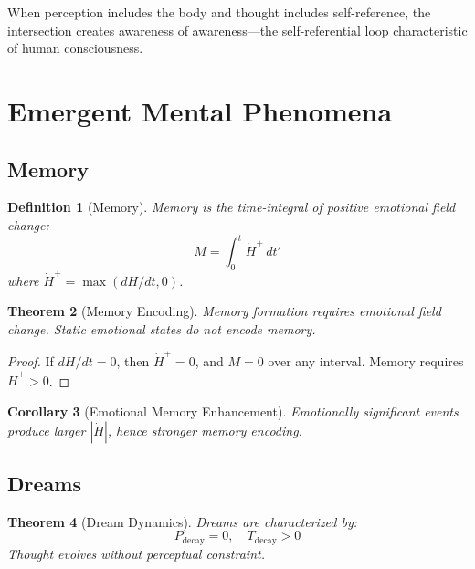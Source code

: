 \documentclass[twocolumn,amsmath,amssymb,aps,prl,superscriptaddress]{revtex4-2}
\newtheorem{theorem}{Theorem}[section]
\newtheorem{corollary}[theorem]{Corollary}
\newtheorem{definition}[theorem]{Definition}
\newcommand{\Pdecay}{P_{\text{decay}}}
\newcommand{\Tdecay}{T_{\text{decay}}}
\newcommand{\Hfield}{H}
\begin{document}
When perception includes the body and thought includes self-reference, the intersection creates awareness of awareness---the self-referential loop characteristic of human consciousness.

\section{Emergent Mental Phenomena}
\label{sec:consequences}

\subsection{Memory}

\begin{definition}[Memory]
\label{def:memory}
Memory is the time-integral of positive emotional field change:
\begin{equation}
\boxed{M = \int_0^t \dot{\Hfield}^+ \, dt'}
\end{equation}
where $\dot{\Hfield}^+ = \max(d\Hfield/dt, 0)$.
\end{definition}

\begin{theorem}[Memory Encoding]
Memory formation requires emotional field change. Static emotional states do not encode memory.
\end{theorem}

\begin{proof}
If $d\Hfield/dt = 0$, then $\dot{\Hfield}^+ = 0$, and $M = 0$ over any interval. Memory requires $\dot{\Hfield}^+ > 0$.
\end{proof}

\begin{corollary}[Emotional Memory Enhancement]
Emotionally significant events produce larger $|\dot{\Hfield}|$, hence stronger memory encoding.
\end{corollary}

\subsection{Dreams}

\begin{theorem}[Dream Dynamics]
\label{thm:dreams}
Dreams are characterized by:
\begin{equation}
\Pdecay = 0, \quad \Tdecay > 0
\end{equation}
Thought evolves without perceptual constraint.
\end{theorem}
\end{document}
